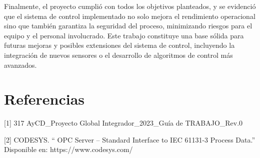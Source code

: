 \documentclass{article}
\begin{document}
    Finalmente, el proyecto cumplió con todos los objetivos planteados, y se evidenció que el sistema de control implementado no solo mejora el rendimiento operacional sino que también garantiza la seguridad del proceso, minimizando riesgos para el equipo y el personal involucrado. Este trabajo constituye una base sólida para futuras mejoras y posibles extensiones del sistema de control, incluyendo la integración de nuevos sensores o el desarrollo de algoritmos de control más avanzados.


\section{Referencias}\label{sec:referencias}

[1] 317 AyCD\_Proyecto Global Integrador\_2023\_Guía de TRABAJO\_Rev.0 

[2] CODESYS. `` OPC Server – Standard Interface to IEC 61131-3 Process Data.'' Disponible en: https://www.codesys.com/



%

%
\end{document}
